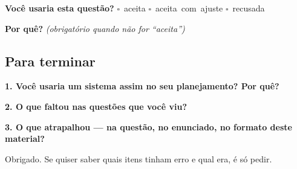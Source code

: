 \documentclass[11pt,a4paper]{article}
\begin{document}
\textbf{Você usaria esta questão?}\quad
\mbox{$\square$~aceita} \quad \mbox{$\square$~aceita com ajuste} \quad
\mbox{$\square$~recusada}

\textbf{Por quê?} \emph{(obrigatório quando não for ``aceita'')}

\underline{\hspace{\linewidth}}

\underline{\hspace{\linewidth}}
\vspace{0.6em}

\newpage
\subsection*{Para terminar}

\textbf{1. Você usaria um sistema assim no seu planejamento? Por quê?}

\underline{\hspace{\linewidth}}

\underline{\hspace{\linewidth}}

\bigskip
\textbf{2. O que faltou nas questões que você viu?}

\underline{\hspace{\linewidth}}

\underline{\hspace{\linewidth}}

\bigskip
\textbf{3. O que atrapalhou --- na questão, no enunciado, no formato deste
material?}

\underline{\hspace{\linewidth}}

\underline{\hspace{\linewidth}}

\bigskip
Obrigado. Se quiser saber quais itens tinham erro e qual era, é só pedir.
\end{document}
